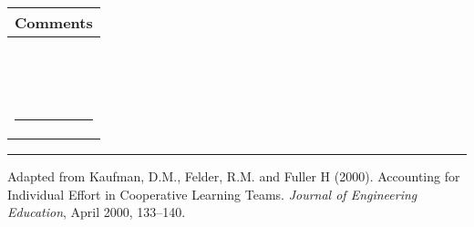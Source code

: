 \documentclass{article}
\begin{document}
\vspace{1cm}



\begin{center}
\begin{tabularx}{0.8\textwidth}{X}
\textbf{\Large Comments} \\
\hline
\vspace{5cm} \\ \\ \\ \\ \\ \\ \\ \\ \\ \\ \\ \\
\hrule
\end{tabularx}
\end{center}


\hrule
\vspace{0.5cm}
\noindent * Adapted from Kaufman, D.M., Felder, R.M. and Fuller H (2000). Accounting for Individual Effort in Cooperative Learning Teams. \textit{Journal of Engineering Education}, April 2000, 133–140.
\end{document}
